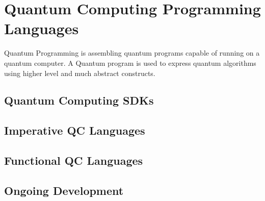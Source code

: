 \chapter{Quantum Computing Programming Languages}
Quantum Programming is assembling quantum programs capable of running on a quantum computer. A Quantum program is used to express quantum algorithms using higher level and much abstract constructs.

\section{Quantum Computing SDKs}
\cite{einstein}
\section{Imperative QC Languages}
\section{Functional QC Languages}
\section{Ongoing Development}